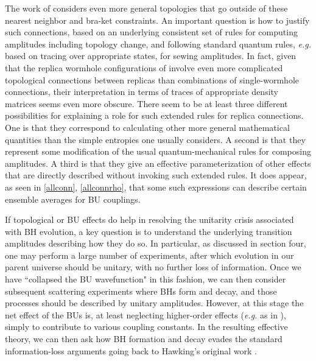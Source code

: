 \documentclass[11pt]{article}
\numberwithin{equation}{section}
\begin{document}
The work of  \cite{Penington:2019kki, Almheiri:2019qdq} considers even more general topologies that go outside of these nearest neighbor and bra-ket constraints.  An important question is how to justify such connections, based on an underlying consistent set of rules for computing amplitudes including topology change, and following standard quantum rules, {\it e.g.} based on tracing over appropriate states, for sewing amplitudes.  In fact, given that the replica wormhole configurations of \cite{Penington:2019kki, Almheiri:2019qdq} involve even more complicated topological connections between replicas than combinations of single-wormhole connections, their interpretation in terms of traces of appropriate density matrices seems even more obscure.
There seem to be at least three different possibilities for explaining a role for such extended rules for replica connections.  One is that they correspond to calculating other more general mathematical quantities than the simple entropies one usually considers.  A second is that they represent some modification of the usual quantum-mechanical rules for composing amplitudes.  A third is that they give an effective parameterization of other effects that are directly described without invoking such extended rules.  It does appear, as seen in \eqref{allconn}, \eqref{allconnrho}, that some such expressions can describe certain ensemble averages for BU couplings.

If topological or BU effects do help in resolving the unitarity crisis associated with BH evolution, a key question is to understand the underlying transition amplitudes describing how they do so.  In particular, as discussed in section four, one may perform a large number of experiments, after which evolution in our parent universe should be unitary, with no further loss of information.  Once we have ``collapsed the BU wavefunction" in this fashion, we can then consider subsequent scattering experiments where BHs form and decay, and those processes should be described by unitary amplitudes.  However, at this stage the net effect of the BUs is, at least neglecting higher-order effects ({\it e.g.} as in \cite{GiSt3Q}), simply to contribute to various coupling constants.  In the resulting effective theory, we can then ask how BH formation and decay evades the standard information-loss arguments going back to Hawking's original work \cite{Hawking:1974sw}.
\end{document}
